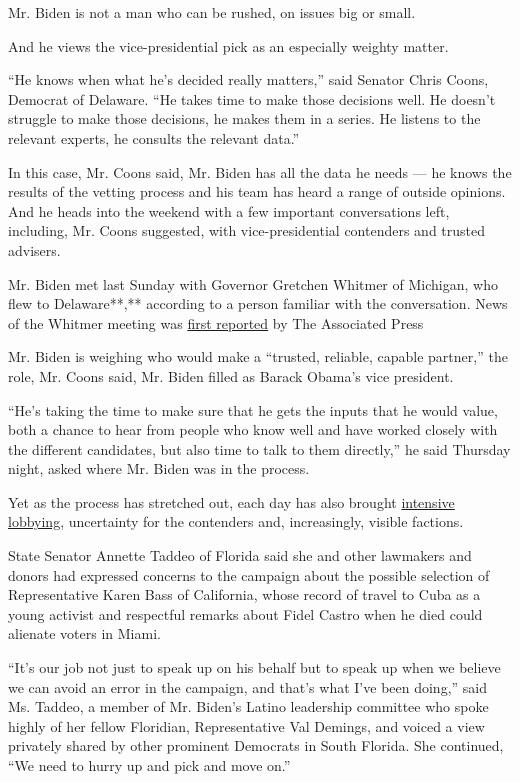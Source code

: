Mr. Biden is not a man who can be rushed, on issues big or small.

And he views the vice-presidential pick as an especially weighty matter.

``He knows when what he's decided really matters,'' said Senator Chris
Coons, Democrat of Delaware. ``He takes time to make those decisions
well. He doesn't struggle to make those decisions, he makes them in a
series. He listens to the relevant experts, he consults the relevant
data.''

In this case, Mr. Coons said, Mr. Biden has all the data he needs --- he
knows the results of the vetting process and his team has heard a range
of outside opinions. And he heads into the weekend with a few important
conversations left, including, Mr. Coons suggested, with
vice-presidential contenders and trusted advisers.

Mr. Biden met last Sunday with Governor Gretchen Whitmer of Michigan,
who flew to Delaware**,** according to a person familiar with the
conversation. News of the Whitmer meeting was
\href{https://slack-redir.net/link?url=https\%3A\%2F\%2Fapnews.com\%2F65025dc16aa18353cf868658d9b2314ahttps\%3A\%2F\%2Fapnews.com\%2F65025dc16aa18353cf868658d9b2314a}{first
reported} by The Associated Press

Mr. Biden is weighing who would make a ``trusted, reliable, capable
partner,'' the role, Mr. Coons said, Mr. Biden filled as Barack Obama's
vice president.

``He's taking the time to make sure that he gets the inputs that he
would value, both a chance to hear from people who know well and have
worked closely with the different candidates, but also time to talk to
them directly,'' he said Thursday night, asked where Mr. Biden was in
the process.

Yet as the process has stretched out, each day has also brought
\href{https://www.nytimes.com/2020/07/31/us/politics/joseph-biden-vice-president.html}{intensive
lobbying}, uncertainty for the contenders and, increasingly, visible
factions.

State Senator Annette Taddeo of Florida said she and other lawmakers and
donors had expressed concerns to the campaign about the possible
selection of Representative Karen Bass of California, whose record of
travel to Cuba as a young activist and respectful remarks about Fidel
Castro when he died could alienate voters in Miami.

``It's our job not just to speak up on his behalf but to speak up when
we believe we can avoid an error in the campaign, and that's what I've
been doing,'' said Ms. Taddeo, a member of Mr. Biden's Latino leadership
committee who spoke highly of her fellow Floridian, Representative Val
Demings, and voiced a view privately shared by other prominent Democrats
in South Florida. She continued, ``We need to hurry up and pick and move
on.''

